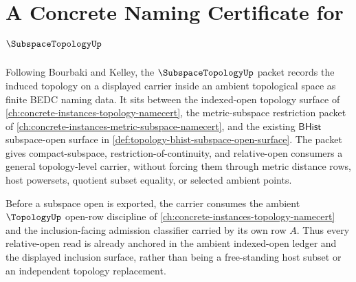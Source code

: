 \chapter{A Concrete Naming Certificate for $\SubspaceTopologyUp$}
\label{ch:concrete-instances-subspace-topology-namecert}

Following Bourbaki and Kelley, the $\SubspaceTopologyUp$ packet records the induced topology on a displayed carrier inside an ambient topological space as finite BEDC naming data. It sits between the indexed-open topology surface of \autoref{ch:concrete-instances-topology-namecert}, the metric-subspace restriction packet of \autoref{ch:concrete-instances-metric-subspace-namecert}, and the existing $\mathsf{BHist}$ subspace-open surface in \autoref{def:topology-bhist-subspace-open-surface}. The packet gives compact-subspace, restriction-of-continuity, and relative-open consumers a general topology-level carrier, without forcing them through metric distance rows, host powersets, quotient subset equality, or selected ambient points.

Before a subspace open is exported, the carrier consumes the ambient $\TopologyUp$ open-row discipline of \autoref{ch:concrete-instances-topology-namecert} and the inclusion-facing admission classifier carried by its own row $A$. Thus every relative-open read is already anchored in the ambient indexed-open ledger and the displayed inclusion surface, rather than being a free-standing host subset or an independent topology replacement.

